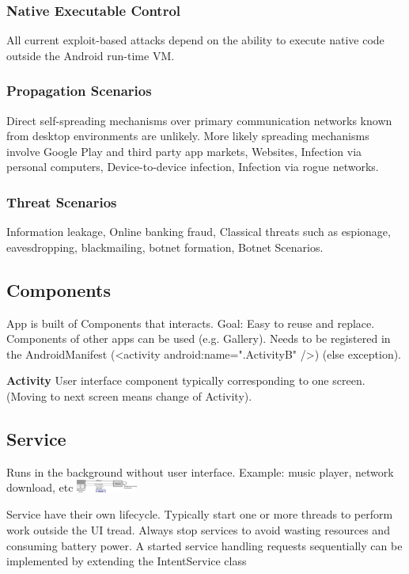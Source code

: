 \subsubsection{Native Executable Control}
All current exploit-based attacks depend on the ability to execute native code
outside the Android run-time VM.

\subsubsection{Propagation Scenarios}
Direct self-spreading mechanisms over primary communication networks known from
desktop environments are unlikely. More likely spreading mechanisms involve
Google Play and third party app markets, Websites, Infection via personal
computers, Device-to-device infection, Infection via rogue networks.

\subsubsection{Threat Scenarios}
Information leakage, Online banking fraud, Classical threats such as espionage,
eavesdropping, blackmailing, botnet formation, Botnet Scenarios.

\subsection{Components}
App is built of Components that interacts. Goal: Easy to reuse and replace.
Components of other apps can be used (e.g. Gallery). Needs to be registered in
the AndroidManifest (<activity android:name=".ActivityB" />) (else exception).

\textbf{Activity}
User interface component typically corresponding to one screen. (Moving to next
screen means change of Activity).

\subsection{Service}
Runs in the background without user interface.
Example: music player, network download, etc
\includegraphics[width=0.15\textwidth]{android/service_example.png}

Service have their own lifecycle. Typically start one or more threads to
perform work outside the UI tread. Always stop services to avoid wasting
resources and consuming battery power. A started service handling requests
sequentially can be implemented by extending the IntentService class

